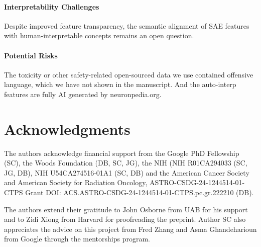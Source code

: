 \paragraph{Interpretability Challenges}  
Despite improved feature transparency, the semantic alignment of SAE features with human-interpretable concepts remains an open question.


\paragraph{Potential Risks}
The toxicity or other safety-related open-sourced data we use contained offensive language, which we have not shown in the manuscript. And the auto-interp features are fully AI generated by neuronpedia.org.

\section*{Acknowledgments}
The authors acknowledge financial support from the Google PhD Fellowship (SC), the Woods Foundation (DB, SC, JG), the NIH (NIH R01CA294033 (SC, JG, DB), NIH U54CA274516-01A1 (SC, DB) and the American Cancer Society and American Society for Radiation Oncology, ASTRO-CSDG-24-1244514-01-CTPS Grant DOI: ACS.ASTRO-CSDG-24-1244514-01-CTPS.pc.gr.222210 (DB).

The authors extend their gratitude to John Osborne from UAB for his support and to Zidi Xiong from Harvard for proofreading the preprint. Author SC also appreciates the advice on this project from Fred Zhang and Asma Ghandeharioun from Google through the mentorships program.

